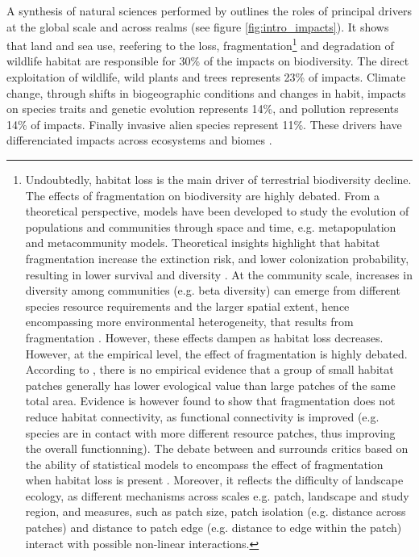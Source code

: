 A synthesis of natural sciences performed by \cite{ipbes_2022_6417333} outlines the roles of principal drivers at the global scale and across realms (see figure \ref{fig:intro_impacts}).
It shows that land and sea use, reefering to the loss, fragmentation\footnote{Undoubtedly, habitat loss is the main driver of terrestrial biodiversity decline. The effects of fragmentation on biodiversity are highly debated. From a theoretical perspective, models have been developed to study the evolution of populations and communities through space and time, e.g. metapopulation and metacommunity models. Theoretical insights highlight that habitat fragmentation increase the extinction risk, and lower colonization probability, resulting in lower survival and diversity \citep{adler_persistence_1994,hill_habitat_1999, thompson_loss_2017}. At the community scale, increases in diversity among communities (e.g. beta diversity) can emerge from different species resource requirements and the larger spatial extent, hence encompassing more environmental heterogeneity, that results from fragmentation \citep{lasky_reserve_2013, chisholm_species_2018}. However, these effects dampen as habitat loss decreases.  
However, at the empirical level, the effect of fragmentation is highly debated. According to \cite{fahrig_ecological_2017}, there is no empirical evidence that a group of small habitat patches generally has lower evological value than large patches of the same total area. Evidence is however found to show that fragmentation does not reduce habitat connectivity, as functional connectivity is improved (e.g. species are in contact with more different resource patches, thus improving the overall functionning). The debate between \citep{fletcher_is_2018} and \citep{fahrig_habitat_2019} surrounds critics based on the ability of statistical models to encompass the effect of fragmentation when habitat loss is present \citep{ruffell_accounting_2016}. Moreover, it reflects the difficulty of landscape ecology, as different mechanisms across scales e.g. patch, landscape and study region, and measures, such as patch size, patch isolation (e.g. distance across patches) and distance to patch edge (e.g. distance to edge within the patch) interact with possible non-linear interactions.}
%
 and degradation of wildlife habitat are responsible for 30\% of the impacts on biodiversity. The direct exploitation of wildlife, wild plants and trees represents 23\% of impacts. Climate change, through shifts in biogeographic conditions and changes in habit, impacts on species traits and genetic evolution represents 14\%, and pollution represents 14\% of impacts. Finally invasive alien species represent 11\%. These drivers have differenciated impacts across ecosystems and biomes \citep{ipbes_2022_6417333}. 

